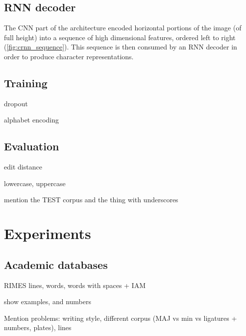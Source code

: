 
	\subsection{RNN decoder}
		The CNN part of the architecture encoded horizontal portions of the image (of full height) into a sequence of high dimensional features, ordered left to right (\autoref{fig:crnn_sequence}). This sequence is then consumed by an RNN decoder in order to produce character representations.



	\subsection{Training}
		dropout

		alphabet encoding



	\subsection{Evaluation}
		edit distance

		lowercase, uppercase

		mention the TEST corpus and the thing with underscores


\section{Experiments}\label{sec:transcription_experiments}


	\subsection{Academic databases}
		RIMES lines, words, words with spaces + IAM

		show examples, and numbers

		Mention problems: writing style, different corpus (MAJ vs min vs ligatures + numbers, plates), lines

